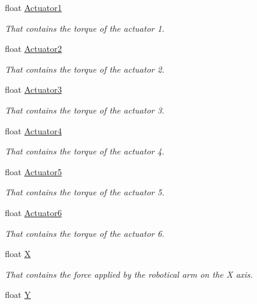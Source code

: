 \begin{DoxyCompactItemize}
\item 
float \hyperlink{struct_forces_info_ab707b88bce0351a0baf4c71e6f3ef1c5}{Actuator1}
\begin{DoxyCompactList}\small\item\em That contains the torque of the actuator 1. \end{DoxyCompactList}\item 
float \hyperlink{struct_forces_info_a5a0dd34e95a333cd094c2de924216850}{Actuator2}
\begin{DoxyCompactList}\small\item\em That contains the torque of the actuator 2. \end{DoxyCompactList}\item 
float \hyperlink{struct_forces_info_acc271f53f83035f2ffc34b9b9f0ce057}{Actuator3}
\begin{DoxyCompactList}\small\item\em That contains the torque of the actuator 3. \end{DoxyCompactList}\item 
float \hyperlink{struct_forces_info_a3e618674ddfe08d0f70224e365a7f1b4}{Actuator4}
\begin{DoxyCompactList}\small\item\em That contains the torque of the actuator 4. \end{DoxyCompactList}\item 
float \hyperlink{struct_forces_info_adb02a0b17096da89857031a95ac625ae}{Actuator5}
\begin{DoxyCompactList}\small\item\em That contains the torque of the actuator 5. \end{DoxyCompactList}\item 
float \hyperlink{struct_forces_info_a501ce0b0d8ea6b22ddd7f140bfa32775}{Actuator6}
\begin{DoxyCompactList}\small\item\em That contains the torque of the actuator 6. \end{DoxyCompactList}\item 
float \hyperlink{struct_forces_info_abda609c2b6bfa10a6925f6dc4563d3b1}{X}
\begin{DoxyCompactList}\small\item\em That contains the force applied by the robotical arm on the X axis. \end{DoxyCompactList}\item 
float \hyperlink{struct_forces_info_a47c77e75fa6c73fafe28ac2a82e6ac96}{Y}

\end{DoxyCompactItemize}
